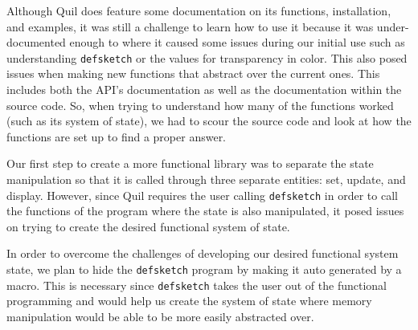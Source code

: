 \documentclass[12pt]{article}
\begin{document}
Although Quil does feature some documentation on its functions, installation, and examples, it was still a challenge to learn how to use it because it was under-documented enough to where it caused some issues during our initial use such as understanding \texttt{defsketch} or the values for transparency in color.
This also posed issues when making new functions that abstract over the current ones. This includes both the API's documentation as well as the documentation within the source code. So, when trying to understand how many of the functions worked (such as its system of state), we had to scour the source code and look at how the functions are set up to find a proper answer.

Our first step to create a more functional library was to separate the state manipulation so that it is called through three separate entities: set, update, and display. However, since Quil requires the user calling \texttt{defsketch} in order to call the functions of the program where the state is also manipulated, it posed issues on trying to create the desired functional system of state.  

In order to overcome the challenges of developing our desired functional system state, we plan to hide the \texttt{defsketch} program by making it auto generated by a macro. This is necessary since \texttt{defsketch} takes the user out of the functional programming and would help us create the system of state where memory manipulation would be able to be more easily abstracted over. 
\end{document}
